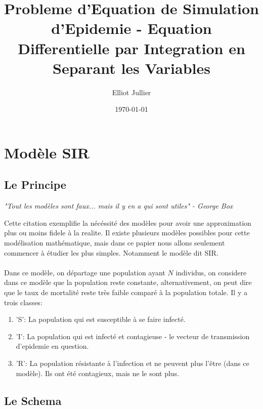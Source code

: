 \documentclass[a4paper,12pt]{scrartcl}
\begin{document}
\title{Probleme d'Equation de Simulation d'Epidemie - Equation Differentielle par Integration en Separant les Variables}
\author{Elliot Jullier}
\date{\today}
\maketitle

\tableofcontents
\newpage
{}

\section{Modèle SIR}
\subsection{Le Principe}

\begin{center}
    \emph{"Tout les modèles sont faux... mais il y en a qui sont utiles" - George Box}
\end{center}
Cette citation exemplifie la nécéssité des modèles pour avoir une approximation plus 
ou moins fidele à la realite. Il existe plusieurs modèles possibles pour cette modélisation mathématique, 
mais dans ce papier nous allons seulement commencer à étudier les plus simples. Notamment le modèle dit SIR.
\\ \\
Dans ce modèle, on départage une population ayant $N$ individus, on considere dans ce modèle que la population
reste constante, alternativement, on peut dire que le taux de mortalité reste très faible comparé à la population totale. Il y a trois classes:
\begin{enumerate}
    \item 'S': La population qui est susceptible à se faire infecté.
    \item 'I': La population qui est infecté et contagieuse -  le vecteur de transmission d'epidemie en question.
    \item 'R': La population résistante à l'infection et ne peuvent plus l'être (dans ce modèle). Ils ont été contagieux, mais ne le sont plus. 
\end{enumerate}

\subsection{Le Schema}

\vspace{10mm}
\end{document}

